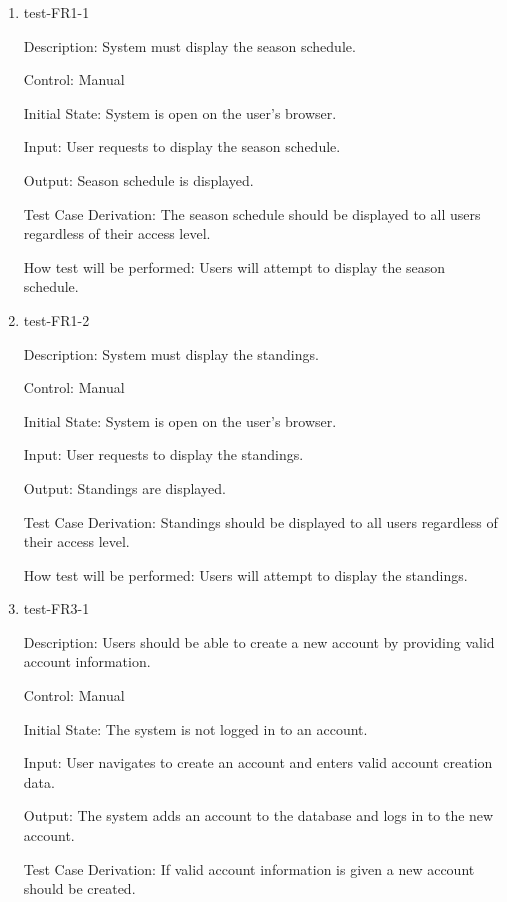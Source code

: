 \documentclass[12pt, titlepage]{article}
\begin{document}
\begin{enumerate}

  \item{test-FR1-1\\}
  
  Description: System must display the season schedule.

  Control: Manual

  Initial State: System is open on the user's browser.

  Input: User requests to display the season schedule.

  Output: Season schedule is displayed.

  Test Case Derivation: The season schedule should be displayed to all users
  regardless of their access level.

  How test will be performed: Users will attempt to display
  the season schedule.

  \item{test-FR1-2\\}
  
  Description: System must display the standings.

  Control: Manual

  Initial State: System is open on the user's browser.

  Input: User requests to display the standings.

  Output: Standings are displayed.

  Test Case Derivation: Standings should be displayed to all users
  regardless of their access level.

  How test will be performed: Users will attempt to display
  the standings.

  \item{test-FR3-1\\}
  
  Description: Users should be able to create a new account by
  providing valid account information.

  Control: Manual

  Initial State: The system is not logged in to an account.

  Input: User navigates to create an account and enters valid account creation
  data.

  Output: The system adds an account to the database and logs in to the new
  account.

  Test Case Derivation: If valid account information is given a new account
  should be created.


\end{enumerate}
\end{document}
